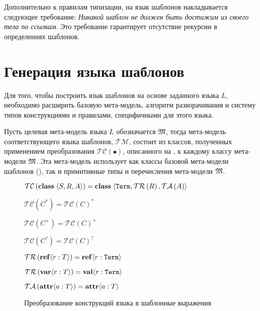 
Дополнительно к правилам типизации, на язык шаблонов накладывается следующее требование: 
\emph{Никакой шаблон не должен быть достижим из своего тела по ссылкам}. Это требование гарантирует отсутствие рекурсии в определениях шаблонов.

\section{Генерация языка шаблонов}

\newcommand{\TM}{\mathcal{TM}}
\newcommand{\TC}[1]{\mathcal{TC}\left(#1\right)}
\newcommand{\TR}[1]{\mathcal{TR}\left(#1\right)}
\newcommand{\TA}[1]{\mathcal{TA}\left(#1\right)}

Для того, чтобы построить язык шаблонов на основе заданного языка $L$, необходимо расширить базовую мета-модель, алгоритм разворачивания и систему типов конструкциями и правилами, специфичными для этого языка. 

Пусть целевая мета-модель языка $L$ обозначается $\mathfrak{M}$, тогда мета-модель соответствующего языка шаблонов, $\TM$, состоит из классов, полученных применением преобразования $\TC{\bullet}$, описанного на , к каждому классу мета-модели $\mathfrak{M}$. Эта мета-модель использует как классы базовой мета-модели шаблонов (), так и примитивные типы и перечисления мета-модели $\mathfrak{M}$.

\begin{figure}[htbp]
	\centering
$\TC{\class{}{S}{R}{A}} = \class{}
			{\mathtt{Term}}{\TR{R}}{\TA{A}}$
			
$\TC{C^*} = \TC{C}^*$

$\TC{C^+} = \TC{C}^+$

$\TC{C^?} = \TC{C}^?$

$\TR{\reference{ref}{r}{T}} = \reference{ref}{r}{\mathtt{Term}}$

$\TR{\reference{var}{r}{T}} = \reference{val}{r}{\mathtt{Term}}$

$\TA{\attribute{a}{T}} = \attribute{a}{T}$
	\caption{Преобразование конструкций языка в шаблонные выражения}\label{TC}
\end{figure}

